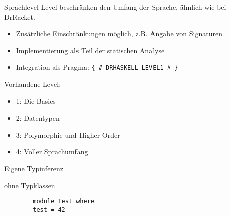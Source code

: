 \begin{frame}{Sprachlevel}
	Level beschränken den Umfang der Sprache, ähnlich wie bei DrRacket.
	\begin{itemize}
		\item Zusätzliche Einschränkungen  möglich, z.B. Angabe von Signaturen
		\item Implementierung als Teil der statischen Analyse
		\item Integration als Pragma: \texttt{\{-\# DRHASKELL LEVEL1 \#-\}}
	\end{itemize}
	Vorhandene Level: \par
	\begin{minipage}[T]{.55 \textwidth}
		\begin{itemize}
			\item 1: Die Basics
			\item 2: Datentypen
			\item 3: Polymorphie und Higher-Order
			\item 4: Voller Sprachumfang
		\end{itemize}
	\end{minipage}
	\begin{minipage}[T]{.4 \textwidth}
			\scalebox{5}{\}} Eigene Typinferenz \par \qquad \quad ohne Typklassen
	\end{minipage}
\end{frame}

\begin{frame}[fragile]
	\begin{lstlisting}
		module Test where
		test = 42
	\end{lstlisting}
\end{frame}